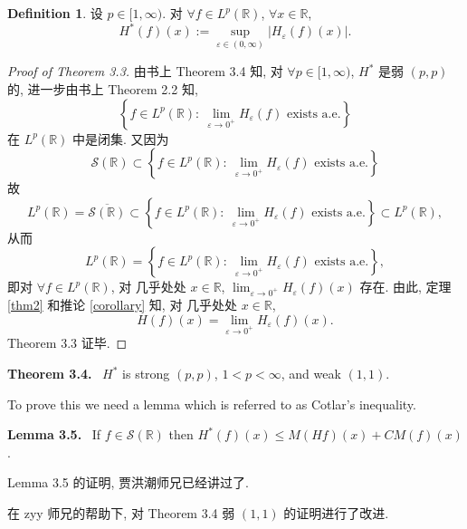 \documentclass[a4paper,11pt]{article}
\theoremstyle{definition}
\newtheorem{definition}[theorem]{Definition}
\begin{document}
\begin{CJK*}{UTF8}{gbsn}
\begin{definition}
    设 $ p \in [1, \infty) $. 对 $ \forall f \in L^p(\mathbb{R}) $, $ \forall x \in \mathbb{R} $,
    $$
        H^* (f) (x) := \sup_{\varepsilon \in (0, \infty)} |H_\varepsilon (f) (x)|.
    $$
\end{definition}

\begin{proof}[Proof of Theorem 3.3]
    由书上 Theorem 3.4 知, 对 $ \forall p \in [1, \infty) $, $ H^* $ 是弱 $ (p, p) $ 的, 进一步由书上 Theorem 2.2 知, 
    $$
        \left\{ f \in L^p(\mathbb{R}) :\ \lim_{\varepsilon \to 0^+} H_\varepsilon (f) \text{ exists a.e.} \right\}
    $$
    在 $ L^p(\mathbb{R}) $ 中是闭集. 又因为
    $$
        \mathcal{S}(\mathbb{R}) \subset
            \left\{ f \in L^p(\mathbb{R}) :\ \lim_{\varepsilon \to 0^+} H_\varepsilon (f) \text{ exists a.e.} \right\}
    $$
    故
    $$
        L^p(\mathbb{R}) = \overline{\mathcal{S}(\mathbb{R})} \subset
            \left\{ f \in L^p(\mathbb{R}) :\ \lim_{\varepsilon \to 0^+} H_\varepsilon (f) \text{ exists a.e.} \right\}
                \subset L^p(\mathbb{R}),
    $$
    从而
    $$
        L^p(\mathbb{R}) 
            = \left\{ f \in L^p(\mathbb{R}) :\ \lim_{\varepsilon \to 0^+} H_\varepsilon (f) \text{ exists a.e.} \right\},
    $$
    即对 $ \forall f \in L^p(\mathbb{R}) $, 对 几乎处处 $ x \in \mathbb{R} $, 
    $ \lim_{\varepsilon \to 0^+} H_\varepsilon (f) (x) $ 存在.
    由此, 定理 \ref{thm2}
    和推论 \ref{corollary} 知, 对 几乎处处 $ x \in \mathbb{R} $,
    $$
        H (f) (x) = \lim_{\varepsilon \to 0^+} H_\varepsilon (f) (x).
    $$
    Theorem 3.3 证毕.
\end{proof}

\begin{framed}
    \vspace{0.2cm}
    \noindent\textbf{Theorem 3.4.} $ \, $ $ H^* $ is strong $ (p,p) $, $ 1 < p < \infty $, and weak $ (1,1) $.
    \vspace{0.3cm}
    
    To prove this we need a lemma which is referred to as Cotlar's inequality.
    
    \vspace{0.2cm}
    \noindent\textbf{Lemma 3.5.} $ \, $ If $ f \in \mathcal{S}(\mathbb{R}) $ then 
    $ H^* (f) (x) \leq M(Hf)(x) + CM(f)(x) $.
\end{framed}

Lemma 3.5 的证明, 贾洪潮师兄已经讲过了.

在 zyy 师兄的帮助下, 对 Theorem 3.4 弱 $ (1, 1) $ 的证明进行了改进.


\end{CJK*}
\end{document}
